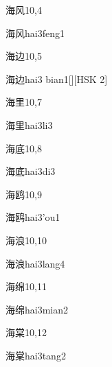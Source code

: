 \begin{entry}{海风}{10,4}
  \begin{phonetics}{海风}{hai3feng1}
  \end{phonetics}
\end{entry}

\begin{entry}{海边}{10,5}
  \begin{phonetics}{海边}{hai3 bian1}[][HSK 2]
  \end{phonetics}
\end{entry}

\begin{entry}{海里}{10,7}
  \begin{phonetics}{海里}{hai3li3}
  \end{phonetics}
\end{entry}

\begin{entry}{海底}{10,8}
  \begin{phonetics}{海底}{hai3di3}
  \end{phonetics}
\end{entry}

\begin{entry}{海鸥}{10,9}
  \begin{phonetics}{海鸥}{hai3'ou1}
  \end{phonetics}
\end{entry}

\begin{entry}{海浪}{10,10}
  \begin{phonetics}{海浪}{hai3lang4}
  \end{phonetics}
\end{entry}

\begin{entry}{海绵}{10,11}
  \begin{phonetics}{海绵}{hai3mian2}
  \end{phonetics}
\end{entry}

\begin{entry}{海棠}{10,12}
  \begin{phonetics}{海棠}{hai3tang2}
  \end{phonetics}
\end{entry}

